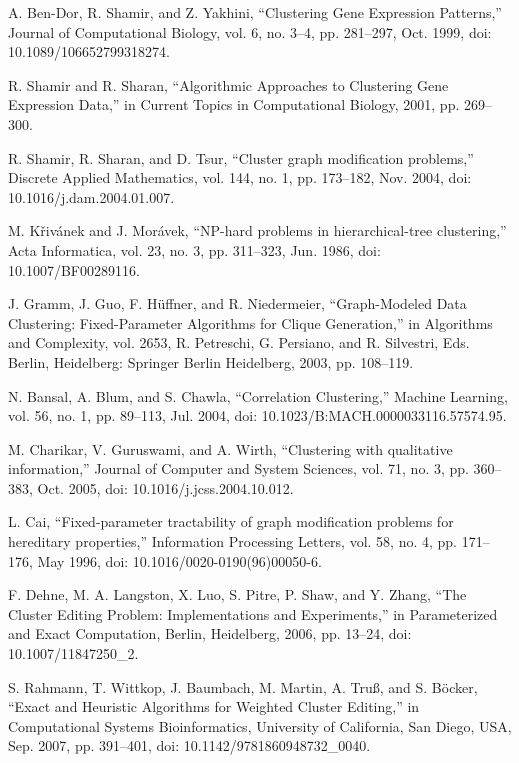 \documentclass{article}
\theoremstyle{definition}
\begin{document}
\begin{thebibliography}{99}

A. Ben-Dor, R. Shamir, and Z. Yakhini, “Clustering Gene Expression Patterns,” Journal of
Computational Biology, vol. 6, no. 3–4, pp. 281–297, Oct. 1999, doi: 10.1089/106652799318274.

R. Shamir and R. Sharan, “Algorithmic Approaches to Clustering Gene Expression Data,” in Current
Topics in Computational Biology, 2001, pp. 269–300.

R. Shamir, R. Sharan, and D. Tsur, “Cluster graph modification problems,” Discrete Applied
Mathematics, vol. 144, no. 1, pp. 173–182, Nov. 2004, doi: 10.1016/j.dam.2004.01.007.

M. Křivánek and J. Morávek, “NP-hard problems in hierarchical-tree clustering,” Acta Informatica,
vol. 23, no. 3, pp. 311–323, Jun. 1986, doi: 10.1007/BF00289116.

J. Gramm, J. Guo, F. Hüffner, and R. Niedermeier, “Graph-Modeled Data Clustering: Fixed-Parameter
Algorithms for Clique Generation,” in Algorithms and Complexity, vol. 2653, R. Petreschi, G.
Persiano, and R. Silvestri, Eds. Berlin, Heidelberg: Springer Berlin Heidelberg, 2003, pp. 108–119.

N. Bansal, A. Blum, and S. Chawla, “Correlation Clustering,” Machine Learning, vol. 56, no. 1,
pp. 89–113, Jul. 2004, doi: 10.1023/B:MACH.0000033116.57574.95.

M. Charikar, V. Guruswami, and A. Wirth, “Clustering with qualitative information,” Journal of
Computer and System Sciences, vol. 71, no. 3, pp. 360–383, Oct. 2005, doi:
10.1016/j.jcss.2004.10.012.

L. Cai, “Fixed-parameter tractability of graph modification problems for hereditary properties,”
Information Processing Letters, vol. 58, no. 4, pp. 171–176, May 1996, doi:
10.1016/0020-0190(96)00050-6.

F. Dehne, M. A. Langston, X. Luo, S. Pitre, P. Shaw, and Y. Zhang, “The Cluster Editing Problem:
Implementations and Experiments,” in Parameterized and Exact Computation, Berlin, Heidelberg, 2006,
pp. 13–24, doi: 10.1007/11847250\_2.

S. Rahmann, T. Wittkop, J. Baumbach, M. Martin, A. Truß, and S. Böcker, “Exact and Heuristic
Algorithms for Weighted Cluster Editing,” in Computational Systems Bioinformatics, University of
California, San Diego, USA, Sep. 2007, pp. 391–401, doi: 10.1142/9781860948732\_0040.


\end{thebibliography}
\end{document}

